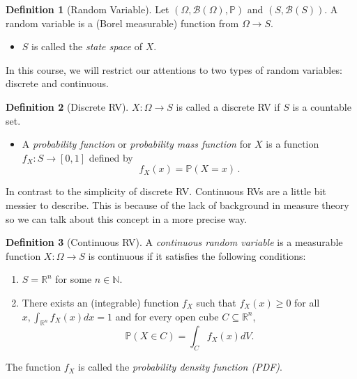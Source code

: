 \documentclass[
  openany]{book}
\providecommand{\tightlist}{%
  \setlength{\itemsep}{0pt}\setlength{\parskip}{0pt}}
\theoremstyle{definition}
\newtheorem{definition}{Definition}[chapter]
\theoremstyle{definition}
\theoremstyle{definition}
\theoremstyle{definition}
\theoremstyle{remark}
\begin{document}
\begin{definition}[Random Variable]

Let \((\Omega, \mathcal{B}(\Omega), \mathbb{P})\) and \((S, \mathcal{B}(S))\).
A random variable is a (Borel measurable) function from \(\Omega \to S\).

\begin{itemize}
\tightlist
\item
  \(S\) is called the \emph{state space} of \(X\).
\end{itemize}

\end{definition}

In this course, we will restrict our attentions to two types of random variables: discrete and continuous.

\begin{definition}[Discrete RV]

\(X: \Omega \to S\) is called
a discrete RV if \(S\) is a countable set.

\begin{itemize}
\tightlist
\item
  A \emph{probability function} or \emph{probability mass function} for \(X\) is a function
  \(f_X: S \to [0,1]\) defined by
  \[ f_X(x) = \mathbb{P}(X = x) \,. \]
\end{itemize}

\end{definition}

In contrast to the simplicity of discrete RV. Continuous RVs are a little bit messier to describe.
This is because of the lack of background in measure theory so we can talk about this concept in
a more precise way.

\begin{definition}[Continuous RV]
A \emph{continuous random variable} is a measurable function \(X:\Omega \to S\) is continuous
if it satisfies the following conditions:

\begin{enumerate}
\def\labelenumi{\arabic{enumi}.}
\item
  \(S = \mathbb{R}^n\) for some \(n\in \mathbb{N}\).
\item
  There exists an (integrable) function \(f_X\) such that \(f_X(x) \geq 0\)
  for all \(x, \int_{\mathbb{R}^n} f_X(x) d x=1\) and for every open cube \(C \subseteq \mathbb{R}^n\),
  \[
  \mathbb{P}(X\in C)=\int_C f_X(x) dV .
  \]
\end{enumerate}

The function \(f_X\) is called the \emph{probability density function (PDF)}.
\end{definition}
\end{document}
